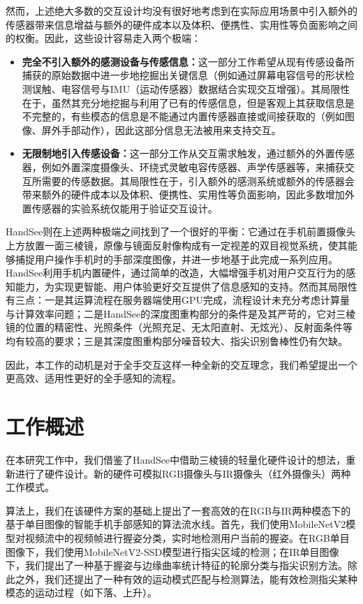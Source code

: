 然而，上述绝大多数的交互设计均没有很好地考虑到在实际应用场景中引入额外的传感器带来信息增益与额外的硬件成本以及体积、便携性、实用性等负面影响之间的权衡。因此，这些设计容易走入两个极端：
\begin{itemize}
\item \textbf{完全不引入额外的感测设备与传感信息：}这一部分工作希望从现有传感设备所捕获的原始数据中进一步地挖掘出关键信息（例如通过屏幕电容信号的形状检测误触、电容信号与IMU（运动传感器）数据结合实现交互增强）。其局限性在于，虽然其充分地挖掘与利用了已有的传感信息，但是客观上其获取信息是不完整的，有些模态的信息是不能通过内置传感器直接或间接获取的（例如图像、屏外手部动作），因此这部分信息无法被用来支持交互。

\item \textbf{无限制地引入传感设备：}这一部分工作从交互需求触发，通过额外的外置传感器，例如外置深度摄像头、环绕式灵敏电容传感器、声学传感器等，来捕获交互所需要的传感数据。其局限性在于，引入额外的感测系统或额外的传感器会带来额外的硬件成本以及体积、便携性、实用性等负面影响，因此多数增加外置传感器的实验系统仅能用于验证交互设计。

\end{itemize}

HandSee\cite{Yu:2019:HEF:3290605.3300935}则在上述两种极端之间找到了一个很好的平衡：它通过在手机前置摄像头上方放置一面三棱镜，原像与镜面反射像构成有一定视差的双目视觉系统，使其能够捕捉用户操作手机时的手部深度图像，并进一步地基于此完成一系列应用。HandSee利用手机内置硬件，通过简单的改造，大幅增强手机对用户交互行为的感知能力，为实现更智能、用户体验更好交互提供了信息感知的支持。然而其局限性有三点：一是其运算流程在服务器端使用GPU完成，流程设计未充分考虑计算量与计算效率问题；二是HandSee的深度图重构部分的条件是及其严苛的，它对三棱镜的位置的精密性、光照条件（光照充足、无太阳直射、无炫光）、反射面条件等均有较高的要求；三是其深度图重构部分噪音较大、指尖识别鲁棒性仍有欠缺。

因此，本工作的动机是对于全手交互\cite{Yu:2019:HEF:3290605.3300935}这样一种全新的交互理念，我们希望提出一个更高效、适用性更好的全手感知的流程。

\section{工作概述}

在本研究工作中，我们借鉴了HandSee\cite{Yu:2019:HEF:3290605.3300935}中借助三棱镜的轻量化硬件设计的想法，重新进行了硬件设计。新的硬件可模拟RGB摄像头与IR摄像头（红外摄像头）两种工作模式。

算法上，我们在该硬件方案的基础上提出了一套高效的在RGB与IR两种模态下的基于单目图像的智能手机手部感知的算法流水线。首先，我们使用MobileNetV2模型对视频流中的视频帧进行握姿分类，实时地检测用户当前的握姿。在RGB单目图像下，我们使用MobileNetV2-SSD模型进行指尖区域的检测；在IR单目图像下，我们提出了一种基于握姿与边缘曲率统计特征的轮廓分类与指尖识别方法。除此之外，我们还提出了一种有效的运动模式匹配与检测算法，能有效检测指尖某种模态的运动过程（如下落、上升）。

